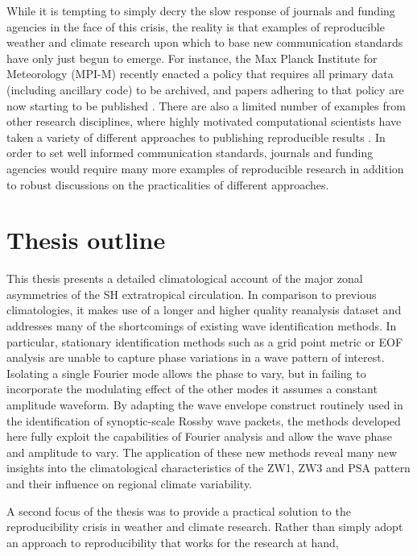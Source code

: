While it is tempting to simply decry the slow response of journals and funding agencies in the face of this crisis, the reality is that examples of reproducible weather and climate research upon which to base new communication standards have only just begun to emerge. For instance, the Max Planck Institute for Meteorology (MPI-M) recently enacted a policy \citep{Stevens2015a} that requires all primary data (including ancillary code) to be archived, and papers adhering to that policy are now starting to be published \citep[e.g.][]{Stevens2015}. There are also a limited number of examples from other research disciplines, where highly motivated computational scientists have taken a variety of different approaches to publishing reproducible results \citep[e.g.][]{Hanigan2012,Ketcheson2012,Crooks2014,Bremges2015,Schmitt2015}. In order to set well informed communication standards, journals and funding agencies would require many more examples of reproducible research in addition to robust discussions on the practicalities of different approaches.  



\section{Thesis outline}

This thesis presents a detailed climatological account of the major zonal asymmetries of the SH extratropical circulation. In comparison to previous climatologies, it makes use of a longer and higher quality reanalysis dataset and addresses many of the shortcomings of existing wave identification methods. In particular, stationary identification methods such as a grid point metric or EOF analysis are unable to capture phase variations in a wave pattern of interest. Isolating a single Fourier mode allows the phase to vary, but in failing to incorporate the modulating effect of the other modes it assumes a constant amplitude waveform. By adapting the wave envelope construct routinely used in the identification of synoptic-scale Rossby wave packets, the methods developed here fully exploit the capabilities of Fourier analysis and allow the wave phase and amplitude to vary. The application of these new methods reveal many new insights into the climatological characteristics of the ZW1, ZW3 and PSA pattern and their influence on regional climate variability.

A second focus of the thesis was to provide a practical solution to the reproducibility crisis in weather and climate research. Rather than simply adopt an approach to reproducibility that works for the research at hand, 


